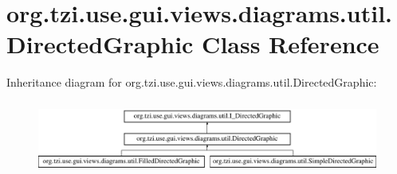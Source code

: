 \hypertarget{classorg_1_1tzi_1_1use_1_1gui_1_1views_1_1diagrams_1_1util_1_1_directed_graphic}{\section{org.\-tzi.\-use.\-gui.\-views.\-diagrams.\-util.\-Directed\-Graphic Class Reference}
\label{classorg_1_1tzi_1_1use_1_1gui_1_1views_1_1diagrams_1_1util_1_1_directed_graphic}
}
Inheritance diagram for org.\-tzi.\-use.\-gui.\-views.\-diagrams.\-util.\-Directed\-Graphic\-:\begin{figure}[H]
\begin{center}
\leavevmode
\includegraphics[height=2.434783cm]{classorg_1_1tzi_1_1use_1_1gui_1_1views_1_1diagrams_1_1util_1_1_directed_graphic}
\end{center}
\end{figure}
